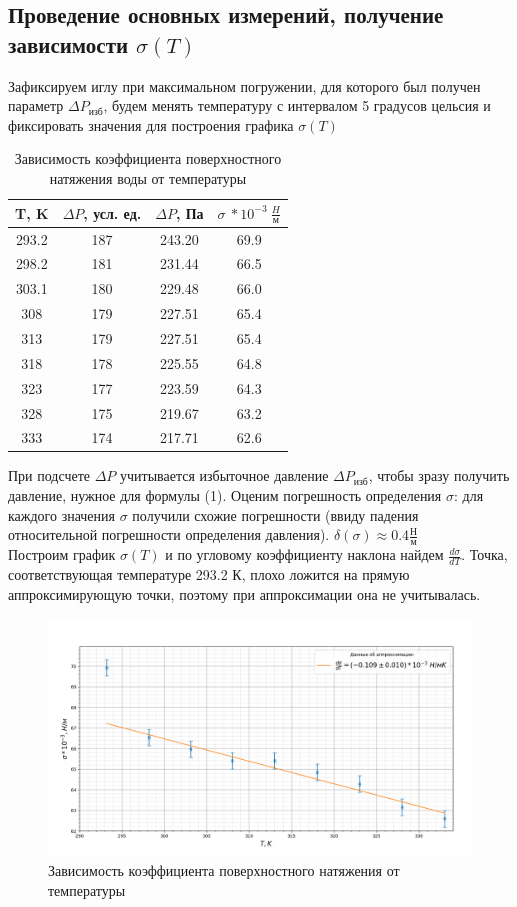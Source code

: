 \documentclass[a4paper, 12pt]{article}%
\begin{document}
	\subsection{Проведение основных измерений, получение зависимости $\sigma(T)$}
	Зафиксируем иглу при максимальном погружении, для которого был получен параметр $\Delta P_{изб}$, будем менять температуру с интервалом 5 градусов цельсия и фиксировать значения для построения графика $\sigma(T)$	\begin{table}[H]
		\centering
		\begin{tabular}{|c|c|c|c|}
			\hline
			T, K & $\Delta P$, усл. ед. & $\Delta P$, Па & $\sigma~ *10^{-3} ~\frac{H}{м}$ \\ \hline
			293.2       & 187              & 243.20       & 69.9  \\ \hline
			298.2       & 181              & 231.44       & 66.5  \\ \hline
			303.1       & 180              & 229.48       & 66.0  \\ \hline
			308         & 179              & 227.51       & 65.4  \\ \hline
			313         & 179              & 227.51       & 65.4  \\ \hline
			318         & 178              & 225.55       & 64.8  \\ \hline
			323         & 177              & 223.59       & 64.3  \\ \hline
			328         & 175              & 219.67       & 63.2  \\ \hline
			333         & 174              & 217.71       & 62.6  \\ \hline
		\end{tabular}
		\caption{Зависимость коэффициента поверхностного натяжения воды от температуры}
	\end{table}
	При подсчете $\Delta P$ учитывается избыточное давление $\Delta P_{изб}$, чтобы зразу получить давление, нужное для формулы (1). Оценим погрешность определения $\sigma$: для каждого значения $\sigma$ получили схожие погрешности (ввиду падения относительной погрешности определения давления). $\delta(\sigma) \approx 0.4 \frac{Н}{м}$ \\
	Построим график $\sigma(T)$ и по угловому коэффициенту наклона найдем $\frac{d\sigma}{dT}$. Точка, соответствующая температуре 293.2 К, плохо ложится на прямую аппроксимирующую точки, поэтому при аппроксимации она не учитывалась.
	\begin{figure}[H]
		\centering
		\includegraphics[width=0.8\linewidth]{graph_sigma}
		\caption{Зависимость коэффициента поверхностного натяжения от температуры}
		\label{fig:graphsigma}
	\end{figure}
\end{document}

